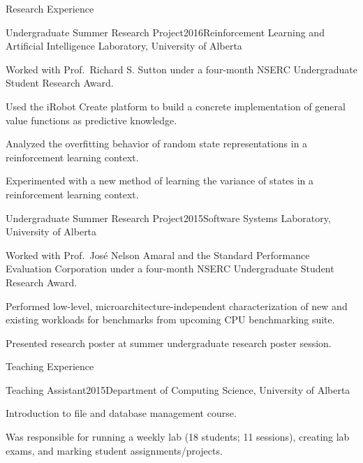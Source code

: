 \documentclass{cv}
\begin{document}
\begin{rSection}{Research Experience}

\begin{rSubsection}{Undergraduate Summer Research Project}{2016}{Reinforcement Learning and Artificial Intelligence Laboratory, University of Alberta}
\item Worked with Prof.~Richard S. Sutton under a four-month NSERC Undergraduate Student Research Award.
\item Used the iRobot Create platform to build a concrete implementation of general value functions as predictive knowledge.
\item Analyzed the overfitting behavior of random state representations in a reinforcement learning context.
\item Experimented with a new method of learning the variance of states in a reinforcement learning context.
\end{rSubsection}


\pagebreak

\begin{rSubsection}{Undergraduate Summer Research Project}{2015}{Software Systems Laboratory, University of Alberta}
\item Worked with Prof.~Jos{\'{e}} Nelson Amaral and the Standard Performance Evaluation Corporation under a four-month NSERC Undergraduate Student Research Award.
\item Performed low-level, microarchitecture-independent characterization of new and existing workloads for benchmarks from upcoming CPU benchmarking suite.
\item Presented research poster at summer undergraduate research poster session.
\end{rSubsection}

\end{rSection}


\begin{rSection}{Teaching Experience}

\begin{rSubsection}{Teaching Assistant}{2015}{Department of Computing Science, University of Alberta}
\item Introduction to file and database management course.
\item Was responsible for running a weekly lab (18 students; 11 sessions), creating lab exams, and marking student assignments/projects.
\end{rSubsection}

\end{rSection}
\end{document}
